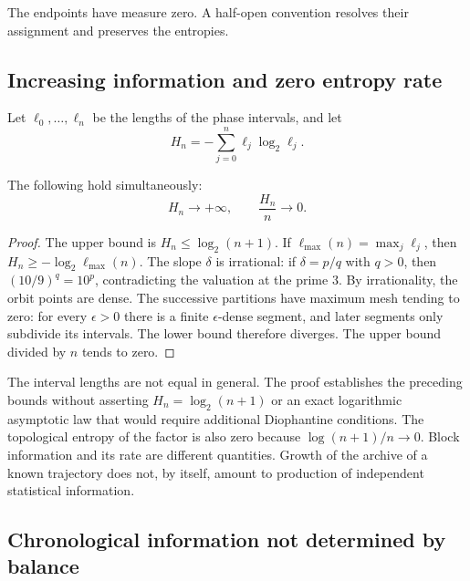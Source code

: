 The endpoints have measure zero. A half-open convention resolves their
assignment and preserves the entropies.

\subsection{Increasing information and zero entropy rate}
\label{md:cron:crecimiento}

Let $\ell_0,\ldots,\ell_n$ be the lengths of the phase intervals, and let
\begin{equation}
 H_n=-\sum_{j=0}^{n}\ell_j\log_2\ell_j.
 \label{md:cron:entropia-bloque}
\end{equation}

\begin{proposition}
\label{md:cron:proposicion-tasa}
The following hold simultaneously:
\begin{equation}
 H_n\longrightarrow+\infty,\qquad
 \frac{H_n}{n}\longrightarrow0.
 \label{md:cron:dos-limites}
\end{equation}
\end{proposition}
\begin{proof}
The upper bound is $H_n\leq\log_2(n+1)$. If
$\ell_{\max}(n)=\max_j\ell_j$, then
$H_n\geq-\log_2\ell_{\max}(n)$.
The slope $\delta$ is irrational: if $\delta=p/q$ with $q>0$,
then $(10/9)^q=10^p$, contradicting the valuation at the prime $3$.
By irrationality, the orbit points are dense. The successive
partitions have maximum mesh tending to zero: for every $\epsilon>0$
there is a finite $\epsilon$-dense segment, and later segments only
subdivide its intervals. The lower bound therefore diverges. The
upper bound divided by $n$ tends to zero.
\end{proof}

The interval lengths are not equal in general. The proof
establishes the preceding bounds without asserting
$H_n=\log_2(n+1)$ or an exact logarithmic asymptotic law that would require
additional Diophantine conditions.
The topological entropy of the factor is also zero because
$\log(n+1)/n\to0$. Block information and its rate are different
quantities. Growth of the archive of a known trajectory does not,
by itself, amount to production of independent statistical information.

\subsection{Chronological information not determined by balance}
\label{md:cron:condicional}


